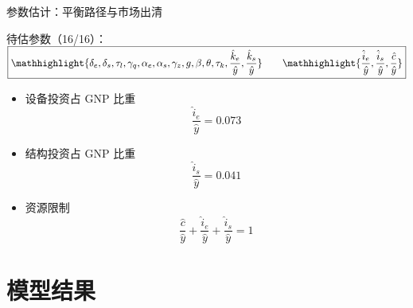 \documentclass[aspectratio=169,10pt]{beamer}
\begin{document}
\begin{frame}{参数估计：平衡路径与市场出清}
  \begin{block}{}
    \begin{center}
      待估参数（16/16）：$\boxed{\mathhighlight{
            \delta_e, \delta_s,  \tau_l, \gamma_q,  \alpha_e, \alpha_s, \gamma_z, g, \beta, \theta, \tau_k, \dfrac{\hat{k}_e}{\hat{y}}, \dfrac{\hat{k}_s}{\hat{y}}} \qquad \mathhighlight{ \dfrac{\hat{i}_e}{\hat{y}}, \dfrac{\hat{i}_s}{\hat{y}}, \dfrac{\hat{c}}{\hat{y}}} }$
    \end{center}
  \end{block}

  \begin{itemize}
    \item[14.] 设备投资占 GNP 比重
          \begin{equation}
            \dfrac{\hat{i}_e}{\hat{y}} = 0.073
          \end{equation}
    \item[15.] 结构投资占 GNP 比重
          \begin{equation}
            \dfrac{\hat{i}_s}{\hat{y}} = 0.041
          \end{equation}
    \item[16.] 资源限制
          \begin{equation} \label{eq:resource}
            \dfrac{\hat{c}}{\hat{y}} + \dfrac{\hat{i}_e}{\hat{y}} + \dfrac{\hat{i}_s}{\hat{y}} = 1
          \end{equation}
  \end{itemize}

\end{frame}

\section{模型结果}
\end{document}
